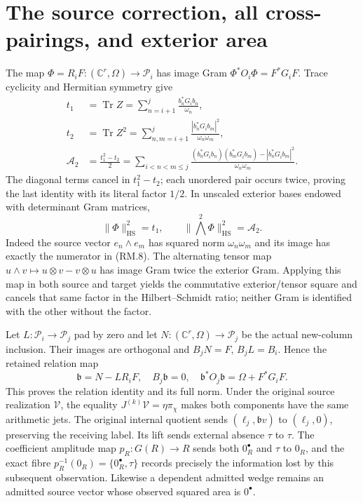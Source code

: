 \documentclass[11pt]{article}
\newcommand{\Tr}{\operatorname{Tr}}\newcommand{\im}{\operatorname{im}}
\newcommand{\HS}{\mathrm{HS}}\newcommand{\rk}{\operatorname{rank}}
\begin{document}
\section{The source correction, all cross-pairings, and exterior area}
The map $\Phi=R_iF:(\mathbb C^r,\Omega)\to\mathcal P_i$ has image Gram
$\Phi^*O_i\Phi=F^*G_iF$. Trace cyclicity and Hermitian symmetry give
\begin{align}
 t_1&=\Tr Z=\sum_{n=i+1}^j\frac{b_n^*G_ib_n}{\omega_n},\tag{RM.6}\\
 t_2&=\Tr Z^2=\sum_{n,m=i+1}^j
 \frac{|b_n^*G_ib_m|^2}{\omega_n\omega_m},\tag{RM.7}\\
 \mathcal A_2&=\frac{t_1^2-t_2}{2}
 =\sum_{i<n<m\le j}\frac{(b_n^*G_ib_n)(b_m^*G_ib_m)
 -|b_n^*G_ib_m|^2}{\omega_n\omega_m}.\tag{RM.8}
\end{align}
The diagonal terms cancel in $t_1^2-t_2$; each unordered pair occurs
twice, proving the last identity with its literal factor $1/2$.
In unscaled exterior bases endowed with determinant Gram matrices,
\begin{equation}
 \|\Phi\|_\HS^2=t_1,\qquad
 \|\bigwedge^2\Phi\|_\HS^2=\mathcal A_2.\tag{RM.9}
\end{equation}
Indeed the source vector $e_n\wedge e_m$ has squared norm
$\omega_n\omega_m$ and its image has exactly the numerator in (RM.8).
The alternating tensor map $u\wedge v\mapsto u\otimes v-v\otimes u$
has image Gram twice the exterior Gram. Applying this map in both source
and target yields the commutative exterior/tensor square and cancels that
same factor in the Hilbert--Schmidt ratio; neither Gram is identified
with the other without the factor.

Let $L:\mathcal P_i\to\mathcal P_j$ pad by zero and let
$N:(\mathbb C^r,\Omega)\to\mathcal P_j$ be the actual new-column
inclusion. Their images are orthogonal and $B_jN=F$, $B_jL=B_i$.
Hence the retained relation map
\begin{equation}
 \mathfrak b=N-LR_iF,\quad B_j\mathfrak b=0,\quad
 \mathfrak b^*O_j\mathfrak b=\Omega+F^*G_iF.\tag{RM.10}
\end{equation}
This proves the relation identity and its full norm. Under the original
source realization $\mathcal V$, the equality
$J^{(k)}\mathcal V=\eta\pi_\chi$ makes both components have the same
arithmetic jets. The original internal quotient sends
$(\ell_j,\mathfrak b v)$ to $(\ell_j,0)$, preserving the receiving
label. Its lift sends external absence $\tau$ to $\tau$. The coefficient
amplitude map $p_R:G(R)\to R$ sends both $0_R^\bullet$ and $\tau$ to
$0_R$, and the exact fibre $p_R^{-1}(0_R)=\{0_R^\bullet,\tau\}$
records precisely the information lost by this subsequent observation.
Likewise a dependent admitted wedge remains an admitted source vector
whose observed squared area is $0^\bullet$.
\end{document}
